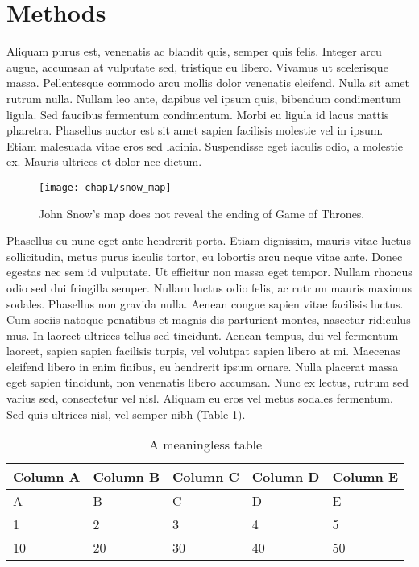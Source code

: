 \section{Methods}

Aliquam purus est, venenatis ac blandit quis, semper quis felis. Integer arcu augue, accumsan at vulputate sed, tristique eu libero. Vivamus ut scelerisque massa. Pellentesque commodo arcu mollis dolor venenatis eleifend. Nulla sit amet rutrum nulla. Nullam leo ante, dapibus vel ipsum quis, bibendum condimentum ligula. Sed faucibus fermentum condimentum. Morbi eu ligula id lacus mattis pharetra. Phasellus auctor est sit amet sapien facilisis molestie vel in ipsum. Etiam malesuada vitae eros sed lacinia. Suspendisse eget iaculis odio, a molestie ex. Mauris ultrices et dolor nec dictum.

\begin{figure}[htb]
  \texttt{[image: chap1/snow\_map]}               
  \caption{John Snow's map does not reveal the ending of Game of Thrones.}
  \label{fig:spin}
\end{figure}

Phasellus eu nunc eget ante hendrerit porta. Etiam dignissim, mauris vitae luctus sollicitudin, metus purus iaculis tortor, eu lobortis arcu neque vitae ante. Donec egestas nec sem id vulputate. Ut efficitur non massa eget tempor. Nullam rhoncus odio sed dui fringilla semper. Nullam luctus odio felis, ac rutrum mauris maximus sodales. Phasellus non gravida nulla. Aenean congue sapien vitae facilisis luctus. Cum sociis natoque penatibus et magnis dis parturient montes, nascetur ridiculus mus. In laoreet ultrices tellus sed tincidunt. Aenean tempus, dui vel fermentum laoreet, sapien sapien facilisis turpis, vel volutpat sapien libero at mi. Maecenas eleifend libero in enim finibus, eu hendrerit ipsum ornare. Nulla placerat massa eget sapien tincidunt, non venenatis libero accumsan. Nunc ex lectus, rutrum sed varius sed, consectetur vel nisl. Aliquam eu eros vel metus sodales fermentum. Sed quis ultrices nisl, vel semper nibh (Table \ref{tab:sample_table}).

\begin{table}[ht]
  \centering
  \begin{tabular}{l l l l l}
    \toprule
    Column A & Column B & Column C & Column D & Column E \\
    \midrule
    A & B & C & D & E \\
    1 & 2 & 3 & 4 & 5 \\
    10 & 20 & 30 & 40 & 50 \\
    \bottomrule
  \end{tabular}
  \caption{A meaningless table}
  \label{tab:sample_table}
\end{table}

